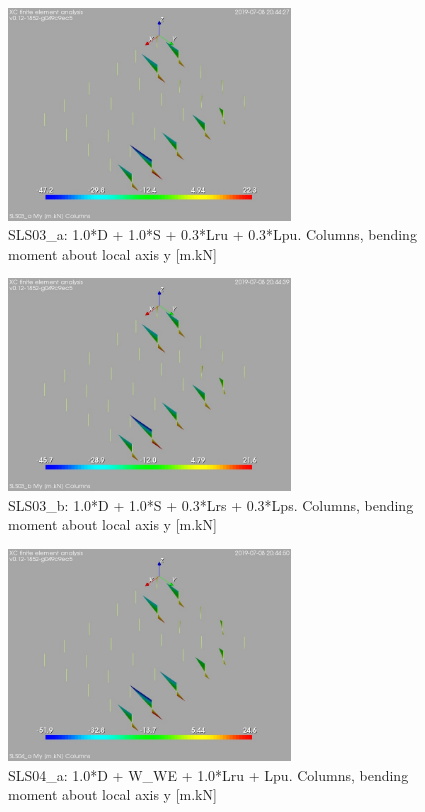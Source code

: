 \begin{figure}
\begin{center}
\includegraphics[width=75mm]{./annex_res_columns/graphics/resSimplLC/SLS03_acolumnsMy}
\caption{SLS03\_a: 1.0*D + 1.0*S + 0.3*Lru + 0.3*Lpu. Columns, bending moment about local axis y [m.kN]}
\end{center}
\end{figure}

\begin{figure}
\begin{center}
\includegraphics[width=75mm]{./annex_res_columns/graphics/resSimplLC/SLS03_bcolumnsMy}
\caption{SLS03\_b: 1.0*D + 1.0*S + 0.3*Lrs + 0.3*Lps. Columns, bending moment about local axis y [m.kN]}
\end{center}
\end{figure}

\begin{figure}
\begin{center}
\includegraphics[width=75mm]{./annex_res_columns/graphics/resSimplLC/SLS04_acolumnsMy}
\caption{SLS04\_a: 1.0*D + W\_WE + 1.0*Lru + Lpu. Columns, bending moment about local axis y [m.kN]}
\end{center}
\end{figure}

